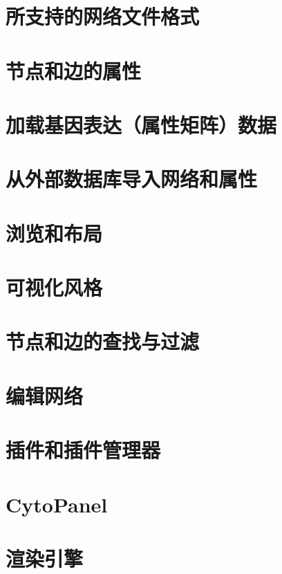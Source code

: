 \documentclass[a4paper, oneside]{book}
\begin{document}
\begin{CJK}{UTF8}{gbsn}
\chapter{所支持的网络文件格式}


\chapter{节点和边的属性}


\chapter{加载基因表达（属性矩阵）数据}


\chapter{从外部数据库导入网络和属性}


\chapter{浏览和布局}


\chapter{可视化风格}


\chapter{节点和边的查找与过滤}


\chapter{编辑网络}


\chapter{插件和插件管理器}


\chapter{CytoPanel}


\chapter{渲染引擎}



\end{CJK}
\end{document}
